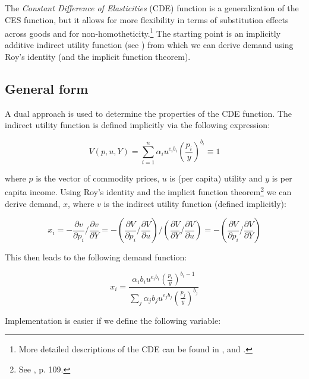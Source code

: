 The \emph{Constant Difference of Elasticities} (CDE) function is a generalization of the CES
function, but it allows for more flexibility in terms of substitution effects across goods and
for non-homotheticity.\footnote{More detailed descriptions of the CDE can be found in
\cite{Herteletal1991}, \cite{Surry1993} and \cite{Hertel1997}.}  The starting point is an
implicitly additive indirect utility function (see \cite{Hanoch1975}) from which we can derive
demand using Roy's identity (and the implicit function theorem).

\subsection{General form}

A dual approach is used to determine the properties of the CDE function. The indirect utility
function is defined implicitly via the following expression:

\begin{equation}
\label{eq:CDEV}
V(p,u,Y) = \sum_{i=1}^{n}{\alpha_iu^{e_i b_i}\left( \frac{p_i}{y}\right)^{b_i}} \equiv 1
\end{equation}

\noindent where $p$ is the vector of commodity prices, $u$ is (per capita) utility and $y$ is
per capita income. Using Roy's identity and the implicit function theorem\footnote{See
\cite{Varian1992}, p. 109.} we can derive demand, $x$, where $v$ is the indirect utility function
(defined implicitly):

\begin{equation}
{x_i} =  - \frac{{\partial v}}{{\partial {p_i}}} /
\frac{{\partial v}}{{\partial Y}} =
- \left( {\frac{{\partial V}}{{\partial {p_i}}} /
\frac{{\partial V}}{{\partial u}}} \right) /
\left( {\frac{{\partial V}}{{\partial Y}} /
\frac{{\partial V}}{{\partial u}}} \right)
=  - \left( {\frac{{\partial V}}{{\partial {p_i}}}/\frac{{\partial V}}{{\partial Y}}} \right)
\end{equation}

\noindent This then leads to the following demand function:

\begin{equation}
\label{eq:CDEP}
{x_i} = \frac{{{\alpha_i}{b_i}{u^{{e_i}{b_i}}}{{\left( {\frac{{{p_i}}}{y}} \right)}^{{b_i} - 1}}}}
{{\sum\limits_j {{\alpha_j}{b_j}{u^{{e_j}{b_j}}}{{\left( {\frac{{{p_j}}}{y}} \right)}^{{b_j}}}} }}
\end{equation}

Implementation is easier if we define the following variable:

